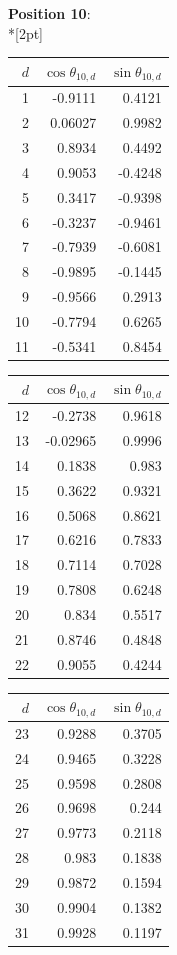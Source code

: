 \noindent \textbf{Position 10}:\\*[2pt]
{\tablefont \begin{tabular}[t]{r|rr}
$d$ & $\cos\theta_{10,d}$ & $\sin\theta_{10,d}$ \\\hline
1 & -0.9111 & 0.4121 \\
2 & 0.06027 & 0.9982 \\
3 & 0.8934 & 0.4492 \\
4 & 0.9053 & -0.4248 \\
5 & 0.3417 & -0.9398 \\
6 & -0.3237 & -0.9461 \\
7 & -0.7939 & -0.6081 \\
8 & -0.9895 & -0.1445 \\
9 & -0.9566 & 0.2913 \\
10 & -0.7794 & 0.6265 \\
11 & -0.5341 & 0.8454
\end{tabular}\kern4pt
\begin{tabular}[t]{r|rr}
$d$ & $\cos\theta_{10,d}$ & $\sin\theta_{10,d}$ \\\hline
12 & -0.2738 & 0.9618 \\
13 & -0.02965 & 0.9996 \\
14 & 0.1838 & 0.983 \\
15 & 0.3622 & 0.9321 \\
16 & 0.5068 & 0.8621 \\
17 & 0.6216 & 0.7833 \\
18 & 0.7114 & 0.7028 \\
19 & 0.7808 & 0.6248 \\
20 & 0.834 & 0.5517 \\
21 & 0.8746 & 0.4848 \\
22 & 0.9055 & 0.4244
\end{tabular}\kern4pt
\begin{tabular}[t]{r|rr}
$d$ & $\cos\theta_{10,d}$ & $\sin\theta_{10,d}$ \\\hline
23 & 0.9288 & 0.3705 \\
24 & 0.9465 & 0.3228 \\
25 & 0.9598 & 0.2808 \\
26 & 0.9698 & 0.244 \\
27 & 0.9773 & 0.2118 \\
28 & 0.983 & 0.1838 \\
29 & 0.9872 & 0.1594 \\
30 & 0.9904 & 0.1382 \\
31 & 0.9928 & 0.1197 \\

\end{tabular}}
